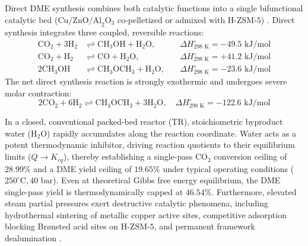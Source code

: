 \documentclass[12pt,a4paper]{article}
\begin{document}
Direct DME synthesis combines both catalytic functions into a single bifunctional catalytic bed ($\text{Cu/ZnO/Al}_2\text{O}_3$ co-pelletized or admixed with $\text{H-ZSM-5}$) \cite{ge1998, alvarez2017}. Direct synthesis integrates three coupled, reversible reactions:
\begin{align}
    \text{CO}_2 + 3\text{H}_2 &\rightleftharpoons \text{CH}_3\text{OH} + \text{H}_2\text{O}, \quad &\Delta H^\circ_{298\text{ K}} = -49.5\text{ kJ/mol} \label{eq:rxn1} \\
    \text{CO}_2 + \text{H}_2 &\rightleftharpoons \text{CO} + \text{H}_2\text{O}, \quad &\Delta H^\circ_{298\text{ K}} = +41.2\text{ kJ/mol} \label{eq:rxn2} \\
    2\text{CH}_3\text{OH} &\rightleftharpoons \text{CH}_3\text{OCH}_3 + \text{H}_2\text{O}, \quad &\Delta H^\circ_{298\text{ K}} = -23.6\text{ kJ/mol} \label{eq:rxn3}
\end{align}
The net direct synthesis reaction is strongly exothermic and undergoes severe molar contraction:
\begin{equation}
    2\text{CO}_2 + 6\text{H}_2 \rightleftharpoons \text{CH}_3\text{OCH}_3 + 3\text{H}_2\text{O}, \quad \Delta H^\circ_{298\text{ K}} = -122.6\text{ kJ/mol} \label{eq:rxn4}
\end{equation}

In a closed, conventional packed-bed reactor (TR), stoichiometric byproduct water ($\text{H}_2\text{O}$) rapidly accumulates along the reaction coordinate. Water acts as a potent thermodynamic inhibitor, driving reaction quotients to their equilibrium limits ($Q \to K_{eq}$), thereby establishing a single-pass $\text{CO}_2$ conversion ceiling of $28.99\%$ and a DME yield ceiling of $19.65\%$ under typical operating conditions ($250^\circ\text{C}, 40\text{ bar}$). Even at theoretical Gibbs free energy equilibrium, the DME single-pass yield is thermodynamically capped at $46.54\%$. Furthermore, elevated steam partial pressures exert destructive catalytic phenomena, including hydrothermal sintering of metallic copper active sites, competitive adsorption blocking Br\o nsted acid sites on $\text{H-ZSM-5}$, and permanent framework dealumination \cite{twigg2001, bonura2014, sierra2010}.
\end{document}
